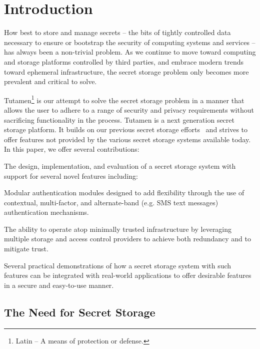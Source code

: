 \section{Introduction}
\label{sec:intro}

How best to store and manage secrets -- the bits of tightly controlled
data necessary to ensure or bootstrap the security of computing
systems and services -- has always been a non-trivial problem. As we
continue to move toward computing and storage platforms controlled by
third parties, and embrace modern trends toward ephemeral
infrastructure, the secret storage problem only becomes more prevalent
and critical to solve.

Tutamen\footnote{Latin -- A means of protection or defense.} is our
attempt to solve the secret storage problem in a manner that allows
the user to adhere to a range of security and privacy requirements
without sacrificing functionality in the process. Tutamen is a next
generation secret storage platform. It builds on our previous secret
storage efforts~\cite{custos-trios} and strives to offer features not
provided by the various secret storage systems available today. In
this paper, we offer several contributions:

\begin{packed_item}
\item The design, implementation, and evaluation of a secret storage
  system with support for several novel features including:
  \begin{packed_item}
  \item Modular authentication modules designed to add flexibility
    through the use of contextual, multi-factor, and alternate-band
    (e.g. SMS text messages) authentication mechanisms.
  \item The ability to operate atop minimally trusted infrastructure
    by leveraging multiple storage and access control providers to
    achieve both redundancy and to mitigate trust.
  \end{packed_item}
\item Several practical demonstrations of how a secret storage system
  with such features can be integrated with real-world applications to
  offer desirable features in a secure and easy-to-use manner.
\end{packed_item}

\subsection{The Need for Secret Storage}


